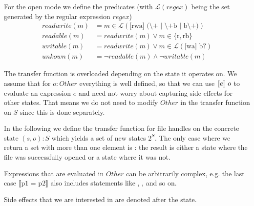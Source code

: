 For the open mode we define the predicates (with $\mathcal{L}(\mathit{regex})$ being the set generated by the regular expression $\mathit{regex}$)
\begin{align}
\mathit{readwrite}(m) &= m \in \mathcal{L}(\text{[rwa] (\textbackslash+ | \textbackslash+b | b\textbackslash+)})\\
\mathit{readable}(m) &= \mathit{readwrite}(m) \vee m \in \{\text{r}, \text{rb}\}\\
\mathit{writable}(m) &= \mathit{readwrite}(m) \vee m \in \mathcal{L}(\text{[wa] b?})\\
\mathit{unkown}(m) &= \neg \mathit{readable}(m) \wedge \neg \mathit{writable}(m)
\end{align}

The transfer function is overloaded depending on the state it operates on. We assume that for $o : Other$ everything is well defined, so that we can use $\llbracket e \rrbracket \; o$ to evaluate an expression $e$ and need not worry about capturing side effects for other states. That means we do not need to modify $Other$ in the transfer function on $S$ since this is done separately.

In the following we define the transfer function for file handles on the concrete state $(s,o) : S$ which yields a set of new states $2^S$. The only case where we return a set with more than one element is : the result is either a state where the file was successfully opened or a state where it was not.

Expressions that are evaluated in $Other$ can be arbitrarily complex, e.g. the last case  $\llbracket \text{p1 = p2} \rrbracket$ also includes statements like , ,  and so on.

Side effects that we are interested in are denoted after the state.

